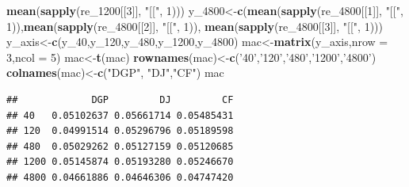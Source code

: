 \documentclass[
]{article}
\newenvironment{Shaded}{\begin{snugshade}}{\end{snugshade}}
\newcommand{\DataTypeTok}[1]{\textcolor[rgb]{0.13,0.29,0.53}{#1}}
\newcommand{\DecValTok}[1]{\textcolor[rgb]{0.00,0.00,0.81}{#1}}
\newcommand{\KeywordTok}[1]{\textcolor[rgb]{0.13,0.29,0.53}{\textbf{#1}}}
\newcommand{\NormalTok}[1]{#1}
\newcommand{\StringTok}[1]{\textcolor[rgb]{0.31,0.60,0.02}{#1}}
\begin{document}
\begin{Shaded}
\begin{Highlighting}[]
        \KeywordTok{mean}\NormalTok{(}\KeywordTok{sapply}\NormalTok{(re_}\DecValTok{1200}\NormalTok{[[}\DecValTok{3}\NormalTok{]], }\StringTok{"[["}\NormalTok{, }\DecValTok{1}\NormalTok{)))}
\NormalTok{y_}\DecValTok{4800}\NormalTok{<-}\KeywordTok{c}\NormalTok{(}\KeywordTok{mean}\NormalTok{(}\KeywordTok{sapply}\NormalTok{(re_}\DecValTok{4800}\NormalTok{[[}\DecValTok{1}\NormalTok{]], }\StringTok{"[["}\NormalTok{, }\DecValTok{1}\NormalTok{)),}\KeywordTok{mean}\NormalTok{(}\KeywordTok{sapply}\NormalTok{(re_}\DecValTok{4800}\NormalTok{[[}\DecValTok{2}\NormalTok{]], }\StringTok{"[["}\NormalTok{, }\DecValTok{1}\NormalTok{)),}
        \KeywordTok{mean}\NormalTok{(}\KeywordTok{sapply}\NormalTok{(re_}\DecValTok{4800}\NormalTok{[[}\DecValTok{3}\NormalTok{]], }\StringTok{"[["}\NormalTok{, }\DecValTok{1}\NormalTok{)))}
\NormalTok{y_axis<-}\KeywordTok{c}\NormalTok{(y_}\DecValTok{40}\NormalTok{,y_}\DecValTok{120}\NormalTok{,y_}\DecValTok{480}\NormalTok{,y_}\DecValTok{1200}\NormalTok{,y_}\DecValTok{4800}\NormalTok{)}
\NormalTok{mac<-}\KeywordTok{matrix}\NormalTok{(y_axis,}\DataTypeTok{nrow =} \DecValTok{3}\NormalTok{,}\DataTypeTok{ncol =} \DecValTok{5}\NormalTok{)}
\NormalTok{mac<-}\KeywordTok{t}\NormalTok{(mac)}
\KeywordTok{rownames}\NormalTok{(mac)<-}\KeywordTok{c}\NormalTok{(}\StringTok{'40'}\NormalTok{,}\StringTok{'120'}\NormalTok{,}\StringTok{'480'}\NormalTok{,}\StringTok{'1200'}\NormalTok{,}\StringTok{'4800'}\NormalTok{)}
\KeywordTok{colnames}\NormalTok{(mac)<-}\KeywordTok{c}\NormalTok{(}\StringTok{"DGP"}\NormalTok{, }\StringTok{"DJ"}\NormalTok{,}\StringTok{"CF"}\NormalTok{)}
\NormalTok{mac}
\end{Highlighting}
\end{Shaded}

\begin{verbatim}
##             DGP         DJ         CF
## 40   0.05102637 0.05661714 0.05485431
## 120  0.04991514 0.05296796 0.05189598
## 480  0.05029262 0.05127159 0.05120685
## 1200 0.05145874 0.05193280 0.05246670
## 4800 0.04661886 0.04646306 0.04747420
\end{verbatim}
\end{document}
